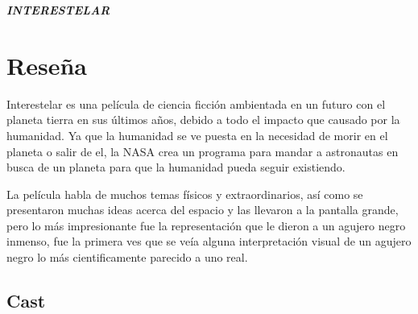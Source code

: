 \documentclass[a5paper, 11pt]{article}
\begin{document}
\begin{center}
\textit{\textbf{\huge{INTERESTELAR}}}    
\end{center}




 \section{Reseña}

 Interestelar es una película de ciencia ficción ambientada en un futuro con el planeta tierra en sus últimos años, debido a todo el impacto que causado por la humanidad. Ya que la humanidad se ve puesta en la necesidad de morir en el planeta o salir de el, la NASA crea un programa para mandar a astronautas en busca de un planeta para que la humanidad pueda seguir existiendo.
 
 La película habla de muchos temas físicos y extraordinarios, así como se presentaron muchas ideas acerca del espacio y las llevaron a la pantalla grande, pero lo más impresionante fue la representación que le dieron a un agujero negro inmenso, fue la primera ves que se veía alguna interpretación visual de un agujero negro lo más cientificamente parecido a uno real.

 \subsection{Cast}
\end{document}
